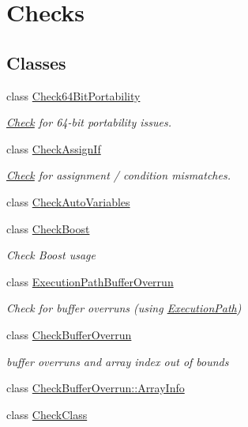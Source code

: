 \hypertarget{group___checks}{\section{Checks}
\label{group___checks}
}
\subsection*{Classes}
\begin{DoxyCompactItemize}
\item 
class \hyperlink{class_check64_bit_portability}{Check64\-Bit\-Portability}
\begin{DoxyCompactList}\small\item\em \hyperlink{class_check}{Check} for 64-\/bit portability issues. \end{DoxyCompactList}\item 
class \hyperlink{class_check_assign_if}{Check\-Assign\-If}
\begin{DoxyCompactList}\small\item\em \hyperlink{class_check}{Check} for assignment / condition mismatches. \end{DoxyCompactList}\item 
class \hyperlink{class_check_auto_variables}{Check\-Auto\-Variables}
\item 
class \hyperlink{class_check_boost}{Check\-Boost}
\begin{DoxyCompactList}\small\item\em Check Boost usage \end{DoxyCompactList}\item 
class \hyperlink{class_execution_path_buffer_overrun}{Execution\-Path\-Buffer\-Overrun}
\begin{DoxyCompactList}\small\item\em Check for buffer overruns (using \hyperlink{class_execution_path}{Execution\-Path}) \end{DoxyCompactList}\item 
class \hyperlink{class_check_buffer_overrun}{Check\-Buffer\-Overrun}
\begin{DoxyCompactList}\small\item\em buffer overruns and array index out of bounds \end{DoxyCompactList}\item 
class \hyperlink{class_check_buffer_overrun_1_1_array_info}{Check\-Buffer\-Overrun\-::\-Array\-Info}
\item 
class \hyperlink{class_check_class}{Check\-Class}

\end{DoxyCompactItemize}
